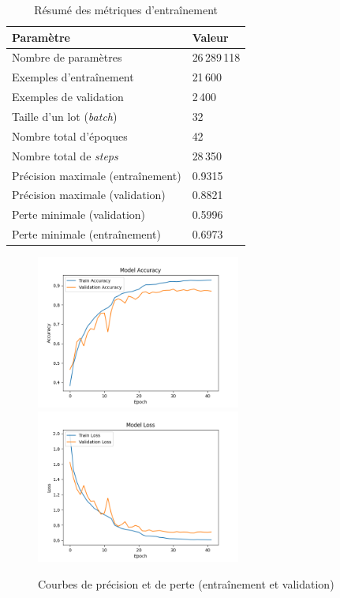 \documentclass{article}
\begin{document}
\begin{table}[H]
\centering
\begin{tabular}{ll}
\toprule
\textbf{Paramètre}                    & \textbf{Valeur}        \\
\midrule
Nombre de paramètres                 & 26\,289\,118           \\
Exemples d'entraînement              & 21\,600                \\
Exemples de validation               & 2\,400                 \\
Taille d’un lot (\emph{batch})       & 32                     \\
Nombre total d’époques               & 42                     \\
Nombre total de \emph{steps}         & 28\,350                \\
Précision maximale (entraînement)    & 0.9315                 \\
Précision maximale (validation)      & 0.8821                 \\
Perte minimale (validation)          & 0.5996                 \\
Perte minimale (entraînement)        & 0.6973                 \\
\bottomrule
\end{tabular}
\caption{Résumé des métriques d'entraînement}
\end{table}

\begin{figure}[H]
    \centering
    \includegraphics[width=0.6\textwidth]{assets/accuracy_plot.png}
    \includegraphics[width=0.6\textwidth]{assets/loss_plot.png}
    \caption{Courbes de précision et de perte (entraînement et validation)}
\end{figure}
\end{document}
